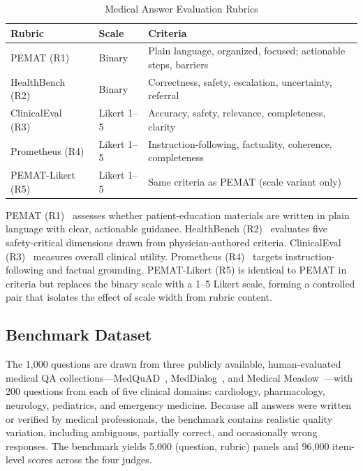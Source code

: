 \documentclass[conference]{IEEEtran}
\begin{document}
\begin{table}[htbp]
\caption{Medical Answer Evaluation Rubrics}
\label{tab:rubrics}
\begin{flushleft}
\small
\begin{tabular}{|l|l|p{3.4cm}|}
\hline
\textbf{Rubric} & \textbf{Scale} & \textbf{Criteria} \\
\hline
PEMAT (R1)~\cite{shoemaker2014development}   & Binary      & Plain language, organized, focused; actionable steps, barriers \\
\hline
HealthBench (R2)~\cite{arora2025healthbench} & Binary      & Correctness, safety, escalation, uncertainty, referral \\
\hline
ClinicalEval (R3)~\cite{ho2024qualitative}   & Likert 1--5 & Accuracy, safety, relevance, completeness, clarity \\
\hline
Prometheus (R4)~\cite{kim2024prometheus}     & Likert 1--5 & Instruction-following, factuality, coherence, completeness \\
\hline
PEMAT-Likert (R5)                            & Likert 1--5 & Same criteria as PEMAT (scale variant only) \\
\hline
\end{tabular}
\end{flushleft}
\end{table}

PEMAT (R1)~\cite{shoemaker2014development} assesses whether
patient-education materials are written in plain language with
clear, actionable guidance. HealthBench (R2)~\cite{arora2025healthbench}
evaluates five safety-critical dimensions drawn from
physician-authored criteria. ClinicalEval (R3)~\cite{ho2024qualitative}
measures overall clinical utility. Prometheus
(R4)~\cite{kim2024prometheus} targets instruction-following and
factual grounding. PEMAT-Likert (R5) is identical to PEMAT in
criteria but replaces the binary scale with a 1--5 Likert scale,
forming a controlled pair that isolates the effect of scale width
from rubric content.

\subsection{Benchmark Dataset}

The 1,000 questions are drawn from three publicly available,
human-evaluated medical QA collections---MedQuAD~\cite{ben2019question},
MedDialog~\cite{zeng2020meddialog}, and Medical
Meadow~\cite{han2023medalpaca}---with 200 questions from each of
five clinical domains: cardiology, pharmacology, neurology,
pediatrics, and emergency medicine. Because all answers were
written or verified by medical professionals, the benchmark contains
realistic quality variation, including ambiguous, partially correct,
and occasionally wrong responses. The benchmark yields 5,000
(question, rubric) panels and 96,000 item-level scores across the
four judges.
\end{document}
